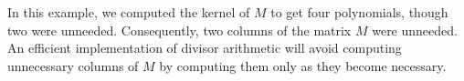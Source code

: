 \begin{remark}
In this example, we computed the kernel of $M$ to get four polynomials, though two were unneeded.
Consequently, two columns of the matrix $M$ were unneeded.
An efficient implementation of divisor arithmetic will avoid computing unnecessary columns of $M$
by computing them only as they become necessary.
\end{remark}




\begin{comment}
\subsection{An example -- non-disjoint case}

Consider again the curve $C : y^3 + x^4 + 1$ over $\bb F_{11}$.
Let $D$ and $D'$ be type 31 divisors with
\begin{align*}
  D  &= \pid{f, g, h}      & D' &= \pid{f', g', h'} \\
  f  &= x^2 + 10           & f' &= x^2 + 3y + 2x + 2 \\
  g  &= xy + y + 9x + 9    & g' &= xy + 4x + 5 \\
  h  &= y^2 + 10y + 4x + 5 & h' &= y^2 + y + 2x + 3 .\\
\end{align*}
These divisors are non-disjoint. We have
\begin{align*}
  D &= (1 : 2 : 1) + (10 : 2\alpha + 4 : 1) + (10 : 10\alpha + 8 : 1) \\
  D' &= (1 : 2 : 1) + (3 : 9 : 1) + (5 : 6 : 1)
\end{align*}
where $\alpha \in \bb F_{11^2}$ is a root of $x^2 + 7x + 2$.

\begin{center}
  \begin{tikzcd}
    W_L^{x^4} \arrow[hook]{r}{\ker M} & 
    W_D^{x^4} \arrow[hook]{r}{\iota} \arrow[bend left]{rr}{M} & 
    W^{x^4} \arrow[two heads]{r}{\pi} & 
    \frac {W^{x^4}} {W_{D'}^{x^4}} \arrow[two heads]{r}{\im M} &
    W_G^y \\ &
    K^7 \arrow[hook]{r} \arrow[no head]{u}{\rotatebox{90}{$\simeq$}} &
    K^{10} \arrow[two heads]{r} \arrow[no head]{u}{\rotatebox{90}{$\simeq$}} &
    K^3 \arrow[no head]{u}{\rotatebox{90}{$\simeq$}}.
  \end{tikzcd}
\end{center}


\end{comment}
